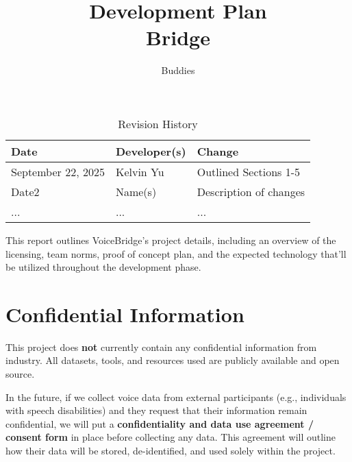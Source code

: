 \documentclass{article}
\title{Development Plan\\\Voice Bridge}
\author{\Speech Buddies}
\date{}
\begin{document}
\maketitle

\begin{table}[hp]
\caption{Revision History} \label{TblRevisionHistory}
\begin{tabularx}{\textwidth}{llX}
\toprule
\textbf{Date} & \textbf{Developer(s)} & \textbf{Change}\\
\midrule
September 22, 2025 & Kelvin Yu & Outlined Sections 1-5\\
Date2 & Name(s) & Description of changes\\
... & ... & ...\\
\bottomrule
\end{tabularx}
\end{table}

\newpage{}

\begin{comment}\wss{Put your introductory blurb here.  Often the blurb is a brief roadmap of
what is contained in the report.}
\end{comment}

This report outlines VoiceBridge’s project details, including an overview of the licensing, team norms, proof of concept plan, and the expected technology that’ll be utilized throughout the development phase.

\begin{comment}\wss{Additional information on the development plan can be found in the
\href{https://gitlab.cas.mcmaster.ca/courses/capstone/-/blob/main/Lectures/L02b_POCAndDevPlan/POCAndDevPlan.pdf?ref_type=heads}
{lecture slides}.}
\end{comment}



\section{Confidential Information}

This project does \textbf{not} currently contain any confidential information from industry. All datasets, tools, and resources used are publicly available and open source.

In the future, if we collect voice data from external participants (e.g., individuals with speech disabilities) and they request that their information remain confidential, we will put a \textbf{confidentiality and data use agreement / consent form} in place before collecting any data. This agreement will outline how their data will be stored, de-identified, and used solely within the project.
\end{document}
